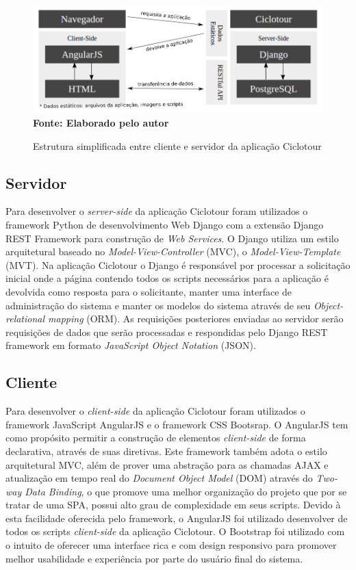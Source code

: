 \begin{figure}[!ht]
	\centering	
	\caption[\hspace{0.1cm} Estrutura simplificada entre cliente e servidor da aplicação Ciclotour.]{Estrutura simplificada entre cliente e servidor da aplicação Ciclotour}
	  \vspace{-0.4cm}
	\includegraphics[width=.8\textwidth]{figuras/estruturaCiclotour.png}
	 \vspace{-0.3cm}
	\\\textbf{\footnotesize Fonte: Elaborado pelo autor}
	\label{fig:estruturaCiclotour}
\end{figure}

\subsection{Servidor}
Para desenvolver o \textit{server-side} da aplicação Ciclotour foram utilizados o framework Python de desenvolvimento Web Django com a extensão 
Django REST Framework para construção de \textit{Web Services}. O Django utiliza um estilo arquitetural baseado no \textit{Model-View-Controller}
(MVC), o \textit{Model-View-Template} (MVT). Na aplicação Ciclotour o Django é responsável por processar a solicitação inicial onde a página
contendo todos os scripts necessários para a aplicação é devolvida como resposta para o solicitante, manter uma interface de administração do sistema
e manter os modelos do sistema através de seu \textit{Object-relational mapping} (ORM). As requisições posteriores enviadas ao servidor serão 
requisições de dados que serão processadas e respondidas pelo Django REST framework em formato \textit{JavaScript Object Notation} (JSON).

\subsection{Cliente}
Para desenvolver o \textit{client-side} da aplicação Ciclotour foram utilizados o framework JavaScript AngularJS e o framework CSS Bootsrap. O 
AngularJS tem como propósito permitir a construção de elementos \textit{client-side} de forma declarativa, através de suas diretivas. Este framework 
também adota o estilo arquitetural MVC, além de prover uma abstração para as chamadas AJAX e atualização em tempo real do 
\textit{Document Object Model} (DOM) através do \textit{Two-way Data Binding}, o que promove uma melhor organização do projeto que por se tratar de
uma SPA, possui alto grau de complexidade em seus scripts. Devido à esta facilidade oferecida pelo framework, o AngularJS foi utilizado desenvolver 
de todos os scripts \textit{client-side} da aplicação Ciclotour. O Bootstrap foi utilizado com o intuito de oferecer uma interface rica e com design
responsivo para promover melhor usabilidade e experiência por parte do usuário final do sistema.